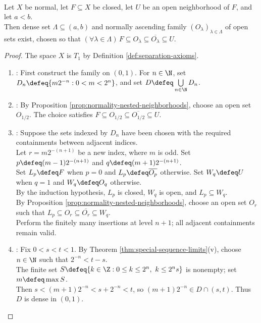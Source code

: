 \begin{lemma} \label{lem:normal-dyadic-neighborhood-ladder} \\
Let $X$ be normal, let $F\subseteq X$ be closed, let $U$ be an open neighborhood of $F$, and let $a<b$.\\
Then dense set $\Lambda\subseteq(a,b)$ and normally ascending family $(O_\lambda)_{\lambda\in\Lambda}$ of open sets exist, chosen so that $(\forall\lambda\in\Lambda)\,F\subseteq O_\lambda\subseteq\overline{O_\lambda}\subseteq U$.
\begin{proof}
The space $X$ is $T_1$ by Definition \ref{def:separation-axioms}.
\begin{enumerate}[label=(\roman*)]
\setlength{\itemsep}{0pt}
\item {}: First construct the family on $(0,1)$. For $n\in\N$, set $D_n\defeq\{m2^{-n}:0<m<2^n\}$, and set $D\defeq\bigcup\limits_{n\in\N}D_n$.
\item {}: By Proposition \ref{prop:normality-nested-neighborhoods}, choose an open set $O_{1/2}$. The choice satisfies $F\subseteq O_{1/2}\subseteq\overline{O_{1/2}}\subseteq U$.
\item {}: Suppose the sets indexed by $D_n$ have been chosen with the required containments between adjacent indices.\\
Let $r=m2^{-(n+1)}$ be a new index, where $m$ is odd. Set $p\defeq(m-1)2^{-(n+1)}$ and $q\defeq(m+1)2^{-(n+1)}$.\\
Set $L_p\defeq F$ when $p=0$ and $L_p\defeq\overline{O_p}$ otherwise. Set $W_q\defeq U$ when $q=1$ and $W_q\defeq O_q$ otherwise.\\
By the induction hypothesis, $L_p$ is closed, $W_q$ is open, and $L_p\subseteq W_q$.\\
By Proposition \ref{prop:normality-nested-neighborhoods}, choose an open set $O_r$ such that $L_p\subseteq O_r\subseteq\overline{O_r}\subseteq W_q$.\\
Perform the finitely many insertions at level $n+1$; all adjacent containments remain valid.
\item {}: Fix $0<s<t<1$. By Theorem \ref{thm:special-sequence-limits}(v), choose $n\in\N$ such that $2^{-n}<t-s$.\\
The finite set $S\defeq\{k\in\Z:0\leq k\leq2^n,\ k\leq2^ns\}$ is nonempty; set $m\defeq\max\limits S$.\\
Then $s<(m+1)2^{-n}<s+2^{-n}<t$, so $(m+1)2^{-n}\in D\cap(s,t)$. Thus $D$ is dense in $(0,1)$.\\

\end{enumerate}
\end{proof}
\end{lemma}
